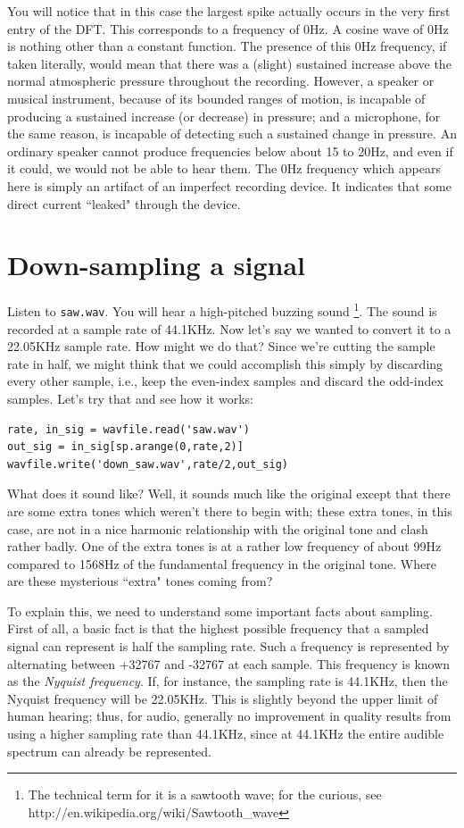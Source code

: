 You will notice that in this case the largest spike actually occurs in the very first entry of the DFT. This corresponds to a frequency of 0Hz. A cosine wave of 0Hz is nothing other than a constant function. The presence of this 0Hz frequency, if taken literally, would mean that there was a (slight) sustained increase above the normal atmospheric pressure throughout the recording. However, a speaker or musical instrument, because of its bounded ranges of motion, is incapable of producing a sustained increase (or decrease) in pressure; and a microphone, for the same reason, is incapable of detecting such a sustained change in pressure. An ordinary speaker cannot produce frequencies below about 15 to 20Hz, and even if it could, we would not be able to hear them. The 0Hz frequency which appears here is simply an artifact of an imperfect recording device. It indicates that some direct current ``leaked" through the device.



\section*{Down-sampling a signal}

Listen to \texttt{saw.wav}. You will hear a high-pitched buzzing sound \footnote{The technical term for it is a sawtooth wave; for the curious, see http://en.wikipedia.org/wiki/Sawtooth\_wave}. The sound is recorded at a sample rate of 44.1KHz. Now let's say we wanted to convert it to a 22.05KHz sample rate. How might we do that? Since we're cutting the sample rate in half, we might think that we could accomplish this simply by discarding every other sample, i.e., keep the even-index samples and discard the odd-index samples. Let's try that and see how it works:
\begin{lstlisting}
rate, in_sig = wavfile.read('saw.wav')
out_sig = in_sig[sp.arange(0,rate,2)]
wavfile.write('down_saw.wav',rate/2,out_sig)
\end{lstlisting}
What does it sound like? Well, it sounds much like the original except that there are some extra tones which weren't there to begin with; these extra tones, in this case, are not in a nice harmonic relationship with the original tone and clash rather badly. One of the extra tones is at a rather low frequency of about 99Hz compared to 1568Hz of the fundamental frequency in the original tone. Where are these mysterious ``extra" tones coming from?

To explain this, we need to understand some important facts about sampling. First of all, a basic fact is that the highest possible frequency that a sampled signal can represent is half the sampling rate. Such a frequency is represented by alternating between +32767 and -32767 at each sample. This frequency is known as the \emph{Nyquist frequency}. If, for instance, the sampling rate is 44.1KHz, then the Nyquist frequency will be 22.05KHz. This is slightly beyond the upper limit of human hearing; thus, for audio, generally no improvement in quality results from using a higher sampling rate than 44.1KHz, since at 44.1KHz the entire audible spectrum can already be represented.

